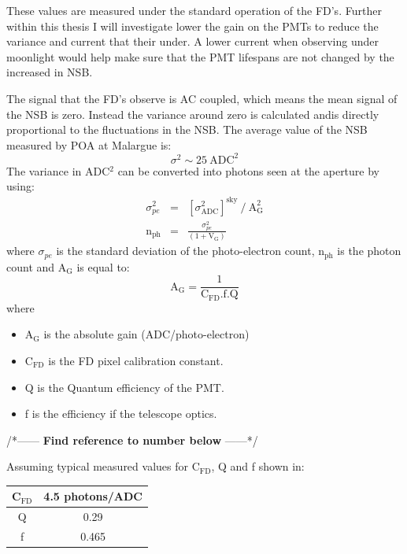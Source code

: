 These values are measured under the standard operation of the FD's. Further within this thesis I will investigate lower the gain on the PMTs to reduce the variance and current that their under. A lower current when observing under moonlight would help make sure that the PMT lifespans are not changed by the increased in NSB.

The signal that the FD's observe is AC coupled, which means the mean signal of the NSB is zero. Instead the variance around zero is calculated andis directly proportional to the fluctuations in the NSB. The average value of the NSB measured by POA at Malargue is:
\begin{equation}
\sigma^2 \sim 25 \ \mathrm{ADC}^2
\end{equation}
The variance in ADC$^2$ can be converted into photons seen at the aperture by using:
\begin{eqnarray}
\sigma^2_{pe} &=& [\sigma^2_{\mathrm{ADC}}]^{\mathrm{sky}} \ / \ \mathrm{A}^2_{\mathrm{G}} \label{eq:simgaPE} \\
\mathrm{n}_{\mathrm{ph}} &=& \frac{\sigma^2_{pe}}{(1 + \mathrm{V}_{\mathrm{G}})} \label{eq:numPhoton}
\end{eqnarray}
where $\sigma_{pe}$ is the standard deviation of the photo-electron count, n$_{\mathrm{ph}}$ is the photon count and A$_{\mathrm{G}}$ is equal to:
\begin{equation}\label{eq:abs_gain}
\mathrm{A}_{\mathrm{G}} = \frac{1}{\mathrm{C}_{\mathrm{FD}}.\mathrm{f}.\mathrm{Q}}
\end{equation}
where
\begin{itemize}
\item[] A$_{\mathrm{G}}$ is the absolute gain (ADC/photo-electron)
\item[] $\mathrm{C}_{\mathrm{FD}}$ is the FD pixel calibration constant.
\item[] Q is the Quantum efficiency of the PMT.
\item[] f is the efficiency if the telescope optics.
\end{itemize}

/*------ \textbf{Find reference to number below} ------*/

Assuming typical measured values for C$_{\mathrm{FD}}$, Q and f shown in:

\begin{center}
\begin{tabular}{|c|c|}
\hline
C$_{\mathrm{FD}}$ & 4.5 photons/ADC \\
\hline
Q & 0.29 \\
\hline
f & 0.465 \\
\hline
\end{tabular}
\end{center}


